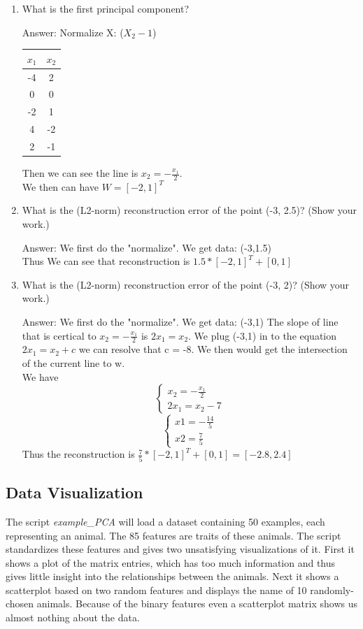 \documentclass{article}
\def\ans#1{\par\gre{Answer: #1}}
\def\blu#1{{\color{blu}#1}}
\def\gre#1{{\color{gre}#1}}
\def\enum#1{\begin{enumerate}#1\end{enumerate}}
\begin{document}
\blu{
\enum{
\item What is the first principal component?
\ans{
    Normalize X: ($X_2-1$) \\
    \begin{tabular}{cc}
        $x_1$ & $x_2$\\
        \hline
        -4 & 2\\
        0 & 0\\
        -2 & 1\\
        4 & -2\\
        2 & -1\\
        \end{tabular}
    Then we can see the line is $x_2 = -\frac {x_1} 2$. \\
    We then can have $W = [-2, 1]^T$
}
\item What is the (L2-norm) reconstruction error of the point (-3, 2.5)? (Show your work.)
\ans{We first do the "normalize". We get data: (-3,1.5) \\
Thus We can see that reconstruction is $ 1.5 * [-2, 1]^T + [0, 1]$
}
\item What is the (L2-norm) reconstruction error of the point (-3, 2)? (Show your work.)
\ans{
    We first do the "normalize". We get data: (-3,1) 
The slope of line that is certical to $x_2 = -\frac{x_1} 2$ is $2 x_1 = x_2$. We plug (-3,1) in to the equation \\
$2x_1 = x_2 + c$ we can resolve that c = -8. We then would get the intersection of the current line to w.\\
    We have \[\begin{cases}
        x_2 = -\frac{x_1} 2 \\
        2x_1 = x_2 - 7
    \end{cases}\]
\[\begin{cases} 
    x1 = - \frac {14} 5 \\
    x2 = \frac{7} {5}
\end{cases}\]
Thus the reconstruction is $ \frac{7} {5} * [-2, 1]^T + [0, 1]= [-2.8, 2.4]$
}
}
}




\subsection{Data Visualization}

The script \emph{example\_PCA} will load a dataset containing 50 examples, each representing an animal. The 85 features are traits of these animals. The script standardizes these features and gives two unsatisfying visualizations of it. First it shows a plot of the matrix entries, which has too much information and thus gives little insight into the relationships between the animals. Next it shows a scatterplot based on two random features and displays the name of 10 randomly-chosen animals. Because of the binary features even a scatterplot matrix shows us almost nothing about the data.
\end{document}
